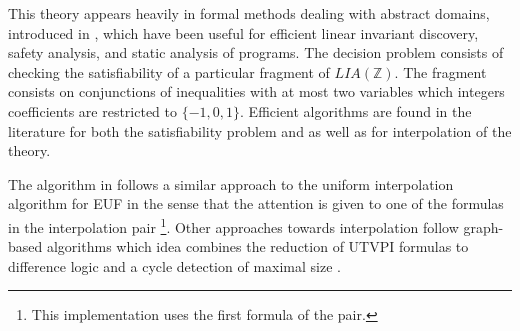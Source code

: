 This theory appears heavily in formal methods dealing
with abstract domains, introduced in 
\cite{journals/corr/abs-cs-0703084}, which have been useful
for efficient linear invariant discovery, safety analysis, and
static analysis of programs.
The decision problem consists of checking the satisfiability
of a particular fragment of $LIA(\mathbb{Z})$. The fragment 
consists on conjunctions of inequalities with at most
two variables which integers coefficients are restricted
to $\{-1, 0, 1\}$. Efficient algorithms are found in the literature 
for both the satisfiability problem \cite{10.1007/11559306_9} and as 
well as for interpolation 
\cite{10.1007/978-3-642-02959-2_15} of the theory. 

The algorithm in \cite{KAPUR2017} follows a similar approach to the
uniform interpolation algorithm for EUF in the sense 
that the attention is given to one of 
the formulas in the interpolation pair \footnote {This implementation uses the first formula of the pair. }.
Other approaches towards interpolation follow graph-based 
algorithms which idea combines the reduction of 
UTVPI formulas to difference 
logic \cite{journals/corr/abs-cs-0703084} and a cycle 
detection of maximal size \cite{10.1007/978-3-642-02959-2_15}.

